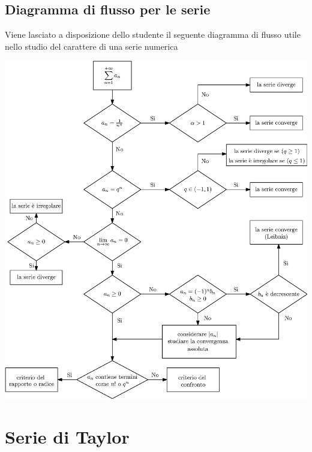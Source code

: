 \documentclass[10pt, letterpaper]{report}
\begin{document}
 \subsection{Diagramma di flusso per le serie}
 Viene lasciato a disposizione dello studente il seguente diagramma di flusso utile nello 
 studio del carattere di una serie numerica
 \begin{center}
    \includegraphics[width=\textwidth ]{images/diagramma_serie.eps}
\end{center} \flowerLine
\newpage
\section{Serie di Taylor}
\end{document}
